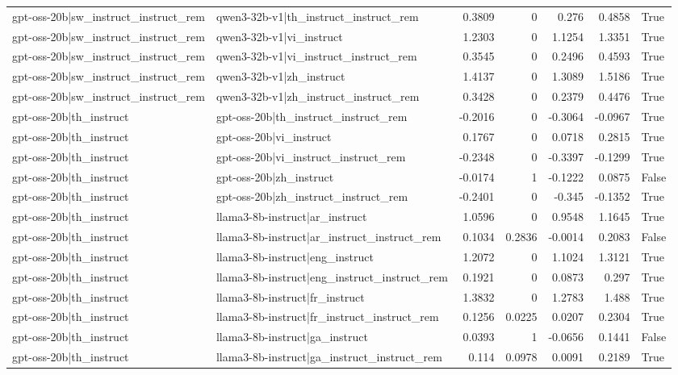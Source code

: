 \begin{table}
\begin{tabular}{l l r r r r l}
gpt-oss-20b|sw_instruct_instruct_rem & qwen3-32b-v1|th_instruct_instruct_rem & 0.3809 & 0 & 0.276 & 0.4858 & True \\
gpt-oss-20b|sw_instruct_instruct_rem & qwen3-32b-v1|vi_instruct & 1.2303 & 0 & 1.1254 & 1.3351 & True \\
gpt-oss-20b|sw_instruct_instruct_rem & qwen3-32b-v1|vi_instruct_instruct_rem & 0.3545 & 0 & 0.2496 & 0.4593 & True \\
gpt-oss-20b|sw_instruct_instruct_rem & qwen3-32b-v1|zh_instruct & 1.4137 & 0 & 1.3089 & 1.5186 & True \\
gpt-oss-20b|sw_instruct_instruct_rem & qwen3-32b-v1|zh_instruct_instruct_rem & 0.3428 & 0 & 0.2379 & 0.4476 & True \\
gpt-oss-20b|th_instruct & gpt-oss-20b|th_instruct_instruct_rem & -0.2016 & 0 & -0.3064 & -0.0967 & True \\
gpt-oss-20b|th_instruct & gpt-oss-20b|vi_instruct & 0.1767 & 0 & 0.0718 & 0.2815 & True \\
gpt-oss-20b|th_instruct & gpt-oss-20b|vi_instruct_instruct_rem & -0.2348 & 0 & -0.3397 & -0.1299 & True \\
gpt-oss-20b|th_instruct & gpt-oss-20b|zh_instruct & -0.0174 & 1 & -0.1222 & 0.0875 & False \\
gpt-oss-20b|th_instruct & gpt-oss-20b|zh_instruct_instruct_rem & -0.2401 & 0 & -0.345 & -0.1352 & True \\
gpt-oss-20b|th_instruct & llama3-8b-instruct|ar_instruct & 1.0596 & 0 & 0.9548 & 1.1645 & True \\
gpt-oss-20b|th_instruct & llama3-8b-instruct|ar_instruct_instruct_rem & 0.1034 & 0.2836 & -0.0014 & 0.2083 & False \\
gpt-oss-20b|th_instruct & llama3-8b-instruct|eng_instruct & 1.2072 & 0 & 1.1024 & 1.3121 & True \\
gpt-oss-20b|th_instruct & llama3-8b-instruct|eng_instruct_instruct_rem & 0.1921 & 0 & 0.0873 & 0.297 & True \\
gpt-oss-20b|th_instruct & llama3-8b-instruct|fr_instruct & 1.3832 & 0 & 1.2783 & 1.488 & True \\
gpt-oss-20b|th_instruct & llama3-8b-instruct|fr_instruct_instruct_rem & 0.1256 & 0.0225 & 0.0207 & 0.2304 & True \\
gpt-oss-20b|th_instruct & llama3-8b-instruct|ga_instruct & 0.0393 & 1 & -0.0656 & 0.1441 & False \\
gpt-oss-20b|th_instruct & llama3-8b-instruct|ga_instruct_instruct_rem & 0.114 & 0.0978 & 0.0091 & 0.2189 & True \\

\end{tabular}
\end{table}
